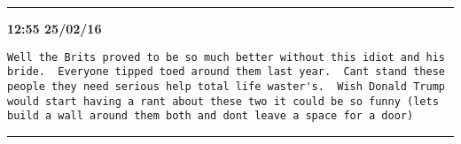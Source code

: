 \hrule%

\begin{adjustwidth}{0cm}{0cm}
\footnotesize \textbf{12:55 25/02/16}

\begin{lstlisting}[breaklines, breakatwhitespace, basicstyle=\small, frame=leftline]
Well the Brits proved to be so much better without this idiot and his bride.  Everyone tipped toed around them last year.  Cant stand these people they need serious help total life waster's.  Wish Donald Trump would start having a rant about these two it could be so funny (lets build a wall around them both and dont leave a space for a door)
\end{lstlisting}
\end{adjustwidth}

\hrule%

